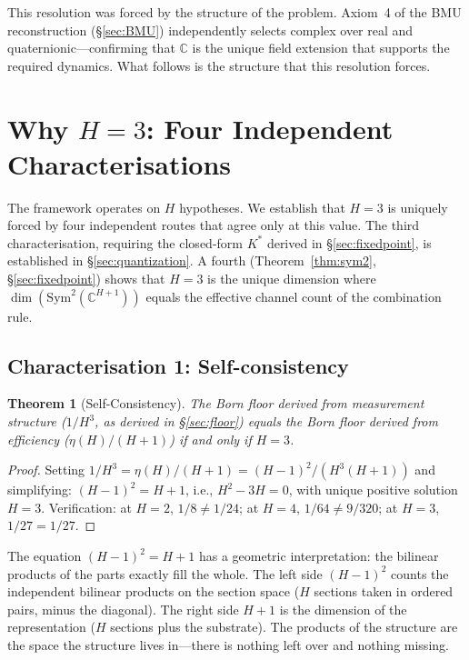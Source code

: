 \documentclass[11pt,a4paper]{article}
\newtheorem{theorem}{Theorem}[section]
\theoremstyle{definition}
\theoremstyle{remark}
\newcommand{\C}{\mathbb{C}}
\begin{document}
This resolution was forced by the structure of the problem. Axiom~4 of the BMU reconstruction (\S\ref{sec:BMU}) independently selects complex over real and quaternionic---confirming that $\C$ is the unique field extension that supports the required dynamics. What follows is the structure that this resolution forces.


\section{Why $H=3$: Four Independent Characterisations}\label{sec:H3}

The framework operates on $H$ hypotheses. We establish that $H=3$ is uniquely forced by four independent routes that agree only at this value. The third characterisation, requiring the closed-form $K^*$ derived in \S\ref{sec:fixedpoint}, is established in \S\ref{sec:quantization}. A fourth (Theorem~\ref{thm:sym2}, \S\ref{sec:fixedpoint}) shows that $H=3$ is the unique dimension where $\dim(\mathrm{Sym}^2(\C^{H+1}))$ equals the effective channel count of the combination rule.

\subsection{Characterisation 1: Self-consistency}

\begin{theorem}[Self-Consistency]\label{thm:selfconsist}
The Born floor derived from measurement structure ($1/H^3$, as derived in \S\ref{sec:floor}) equals the Born floor derived from efficiency ($\eta(H)/(H+1)$) if and only if $H=3$.
\end{theorem}

\begin{proof}
Setting $1/H^3=\eta(H)/(H+1)=(H-1)^2/(H^3(H+1))$ and simplifying: $(H-1)^2=H+1$, i.e., $H^2-3H=0$, with unique positive solution $H=3$. Verification: at $H=2$, $1/8\neq 1/24$; at $H=4$, $1/64\neq 9/320$; at $H=3$, $1/27=1/27$.
\end{proof}

The equation $(H-1)^2=H+1$ has a geometric interpretation: the bilinear products of the parts exactly fill the whole. The left side $(H-1)^2$ counts the independent bilinear products on the section space ($H$ sections taken in ordered pairs, minus the diagonal). The right side $H+1$ is the dimension of the representation ($H$ sections plus the substrate). The products of the structure are the space the structure lives in---there is nothing left over and nothing missing.
\end{document}

